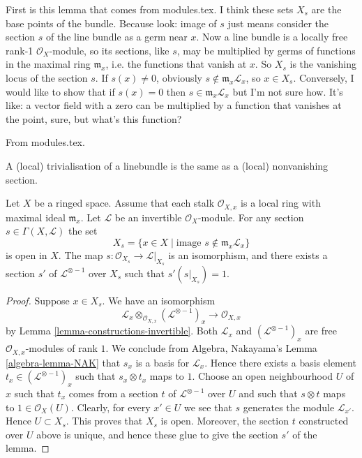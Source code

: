 First is this lemma that comes from modules.tex. I think these sets $X_s$ are
the base points of the bundle. Because look: image of $s$ just means consider
the section $s$ of the line bundle as a germ near $x$. Now a line bundle is a
locally free rank-1 $\mathcal{O}_X$-module, so its sections, like $s$, may be
multiplied by germs of functions in the maximal ring $\mathfrak{m}_x$, i.e. the
functions that vanish at $x$. So $X_s$ is the vanishing locus of the section
$s$. If $s(x)\neq 0$, obviously $s
\not\in\mathfrak{m}_x\mathcal{L}_x$, so $x\in X_s$. Conversely, I would like to
show that if $s(x)=0$ then  $s\in\mathfrak{m}_x\mathcal{L}_x$ but I'm not sure
how. It's like: a vector field with a zero can be multiplied by a function that
vanishes at the point, sure, but what's this function?

\begin{lemma}
\label{lemma-s-open}
From modules.tex.
\begin{slogan}
A (local) trivialisation of a linebundle
is the same as a (local) nonvanishing section.
\end{slogan}
Let $X$ be a ringed space. Assume that each stalk $\mathcal{O}_{X, x}$
is a local ring with maximal ideal $\mathfrak m_x$.
Let $\mathcal{L}$ be an invertible $\mathcal{O}_X$-module.
For any section $s \in \Gamma(X, \mathcal{L})$ the set
$$
X_s = \{x \in X \mid \text{image }s \not\in \mathfrak m_x\mathcal{L}_x\}
$$
is open in $X$. The map $s : \mathcal{O}_{X_s} \to \mathcal{L}|_{X_s}$
is an isomorphism, and there exists a section $s'$
of $\mathcal{L}^{\otimes -1}$ over $X_s$ such that $s' (s|_{X_s}) = 1$.
\end{lemma}

\begin{proof}
Suppose $x \in X_s$.
We have an isomorphism
$$
\mathcal{L}_x \otimes_{\mathcal{O}_{X, x}} (\mathcal{L}^{\otimes -1})_x
\longrightarrow
\mathcal{O}_{X, x}
$$
by Lemma \ref{lemma-constructions-invertible}.
Both $\mathcal{L}_x$ and $(\mathcal{L}^{\otimes -1})_x$
are free $\mathcal{O}_{X, x}$-modules of rank $1$. We conclude
from Algebra, Nakayama's Lemma \ref{algebra-lemma-NAK} that
$s_x$ is a basis for $\mathcal{L}_x$. Hence there exists
a basis element $t_x \in (\mathcal{L}^{\otimes -1})_x$
such that $s_x \otimes t_x$ maps to $1$.
Choose an open neighbourhood $U$ of
$x$ such that $t_x$ comes from a section $t$
of $\mathcal{L}^{\otimes -1}$ over $U$ and such that
$s \otimes t$ maps to $1 \in \mathcal{O}_X(U)$.
Clearly, for every $x' \in U$ we see that $s$ generates
the module $\mathcal{L}_{x'}$. Hence $U \subset X_s$.
This proves that $X_s$ is open. Moreover, the section
$t$ constructed over $U$ above is unique, and hence
these glue to give the section $s'$ of the lemma.
\end{proof}


